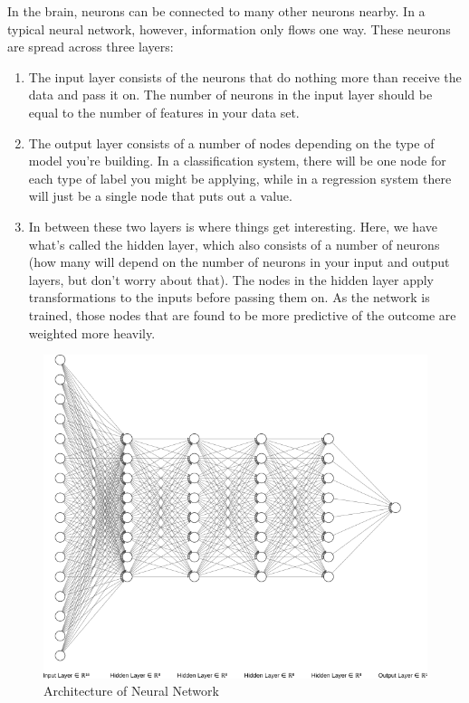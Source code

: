 In the brain, neurons can be connected to many other neurons nearby. In a typical neural network, however, information only flows one way. These neurons are spread across three layers:

\begin{enumerate}
\item The input layer consists of the neurons that do nothing more than receive the data and pass it on. The number of neurons in the input layer should be equal to the number of features in your data set.

\item The output layer consists of a number of nodes depending on the type of model you’re building. In a classification system, there will be one node for each type of label you might be applying, while in a regression system there will just be a single node that puts out a value.

\item In between these two layers is where things get interesting. Here, we have what’s called the hidden layer, which also consists of a number of neurons (how many will depend on the number of neurons in your input and output layers, but don’t worry about that). The nodes in the hidden layer apply transformations to the inputs before passing them on. As the network is trained, those nodes that are found to be more predictive of the outcome are weighted more heavily.
\end{enumerate}


	\begin{figure}[tbh]
	\begin{center}
		\includegraphics[width = 5in]{images/g719.png}
		\caption{Architecture of Neural Network}
		\label{neuralnetwork}
	\end{center}
	\end{figure}

